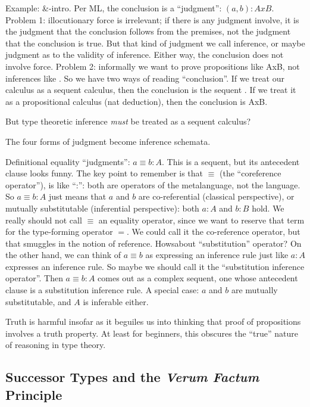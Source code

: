 \documentclass{article}
\begin{document}
Example: \&-intro.  Per ML, the conclusion is a ``judgment'':
\((a,b){:}AxB\).  Problem 1: illocutionary force is irrelevant; if
there is any judgment involve, it is the judgment that the conclusion
follows from the premises, not the judgment that the conclusion is
true.  But that kind of judgment we call inference, or maybe judgment
as to the validity of inference.  Either way, the conclusion does not
involve force.  Problem 2: informally we want to prove propositions
like AxB, not inferences like \abAB.  So we have two ways of
reading ``conclusion''.  If we treat our calculus as a sequent
calculus, then the conclusion is the sequent \abAB.  If we treat
it as a propositional calculus (nat deduction), then the conclusion is
AxB.

But type theoretic inference \emph{must} be treated as a sequent
calculus?

The four forms of judgment become inference schemata.

Definitional equality ``judgments'': \(a\equiv b{:}A\).  This is a
sequent, but its antecedent clause looks funny.  The key point to
remember is that \(\equiv\) (the ``coreference operator''), is like
``:'': both are operators of the metalanguage, not the language.  So
\(a\equiv b{:}A\) just means that \(a\) and \(b\) are co-referential
(classical perspective), or mutually substitutable (inferential
perspective): both \(a{:}A\) and \(b{:}B\) hold.  We really should not
call \(\equiv\) an equality operator, since we want to reserve that
term for the type-forming operator \(=\).  We could call it the
co-reference operator, but that smuggles in the notion of reference.
Howsabout ``substitution'' operator?  On the other hand, we can think
of \(a\equiv b\) as expressing an inference rule just like \(a{:}A\)
expresses an inference rule.  So maybe we should call it the
``substitution inference operator''.  Then \(a\equiv b{:}A\) comes out
as a complex sequent, one whose antecedent clause is a substitution
inference rule.  A special case: \(a\) and \(b\) are mutually
substitutable, and \(A\) is inferable either.

Truth is harmful insofar as it beguiles us into thinking that proof of
propositions involves a truth property.  At least for beginners, this
obscures the ``true'' nature of reasoning in type theory.


\subsection{Successor Types and the \textit{Verum Factum} Principle}
\end{document}
